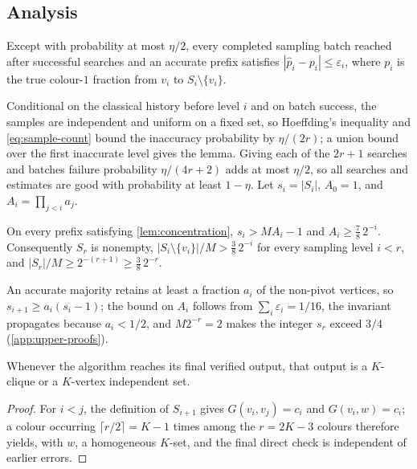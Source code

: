 \subsection{Analysis}

\begin{lemma}\label{lem:concentration}
Except with probability at most $\eta/2$, every completed sampling batch
reached after successful searches and an accurate prefix satisfies
$|\widehat p_i-p_i|\le\varepsilon_i$, where $p_i$ is the true colour-$1$
fraction from $v_i$ to $S_i\setminus\{v_i\}$.
\end{lemma}

Conditional on the classical history before level $i$ and on batch
success, the samples are independent and uniform on a fixed set, so
Hoeffding's inequality and \cref{eq:sample-count} bound the inaccuracy
probability by $\eta/(2r)$; a union bound over the first inaccurate level
gives the lemma.  Giving each of the $2r+1$ searches and batches failure
probability $\eta/(4r+2)$ adds at most $\eta/2$, so all searches and
estimates are good with probability at least $1-\eta$.  Let $s_i=|S_i|$,
$A_0=1$, and $A_i=\prod_{j<i}a_j$.

\begin{lemma}\label{lem:survival}
On every prefix satisfying \cref{lem:concentration},
$s_i>MA_i-1$ and $A_i\ge\frac78\,2^{-i}$.  Consequently $S_r$ is nonempty,
$|S_i\setminus\{v_i\}|/M>\frac38\,2^{-i}$ for every sampling level $i<r$,
and $|S_r|/M\ge2^{-(r+1)}\ge\frac38\,2^{-r}$.
\end{lemma}

An accurate majority retains at least a fraction $a_i$ of the non-pivot
vertices, so $s_{i+1}\ge a_i(s_i-1)$; the bound on $A_i$ follows from
$\sum_i\varepsilon_i=1/16$, the invariant propagates because $a_i<1/2$,
and $M2^{-r}=2$ makes the integer $s_r$ exceed $3/4$
(\cref{app:upper-proofs}).

\begin{lemma}\label{lem:output}
Whenever the algorithm reaches its final verified output, that output is a
$K$-clique or a $K$-vertex independent set.
\end{lemma}

\begin{proof}
For $i<j$, the definition of $S_{i+1}$ gives $G(v_i,v_j)=c_i$ and
$G(v_i,w)=c_i$; a colour occurring $\lceil r/2\rceil=K-1$ times among the
$r=2K-3$ colours therefore yields, with $w$, a homogeneous $K$-set, and the
final direct check is independent of earlier errors.
\end{proof}

